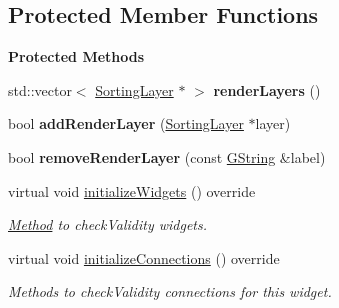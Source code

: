 \subsection*{Protected Member Functions}
\begin{Indent}\textbf{ Protected Methods}\par
\begin{DoxyCompactItemize}
\item 
\mbox{\label{classrev_1_1_view_1_1_render_layer_instance_widget_abce58d0d1c9fdaf0a4e0a95fb1e15ea6}} 
std\+::vector$<$ \mbox{\hyperlink{structrev_1_1_sorting_layer}{Sorting\+Layer}} $\ast$ $>$ {\bfseries render\+Layers} ()
\item 
\mbox{\label{classrev_1_1_view_1_1_render_layer_instance_widget_ab3d57b75fdd3ab6a3db67dc7ae5a32e7}} 
bool {\bfseries add\+Render\+Layer} (\mbox{\hyperlink{structrev_1_1_sorting_layer}{Sorting\+Layer}} $\ast$layer)
\item 
\mbox{\label{classrev_1_1_view_1_1_render_layer_instance_widget_a0578403e177027e7c3880d0a536a2f99}} 
bool {\bfseries remove\+Render\+Layer} (const \mbox{\hyperlink{classrev_1_1_g_string}{G\+String}} \&label)
\item 
\mbox{\label{classrev_1_1_view_1_1_render_layer_instance_widget_afabc7fa617f72e643e15114fdd8f01ce}} 
virtual void \mbox{\hyperlink{classrev_1_1_view_1_1_render_layer_instance_widget_afabc7fa617f72e643e15114fdd8f01ce}{initialize\+Widgets}} () override
\begin{DoxyCompactList}\small\item\em \mbox{\hyperlink{struct_method}{Method}} to check\+Validity widgets. \end{DoxyCompactList}\item 
\mbox{\label{classrev_1_1_view_1_1_render_layer_instance_widget_a6c1e237844ac16c08ec9a5fd0c578d73}} 
virtual void \mbox{\hyperlink{classrev_1_1_view_1_1_render_layer_instance_widget_a6c1e237844ac16c08ec9a5fd0c578d73}{initialize\+Connections}} () override
\begin{DoxyCompactList}\small\item\em Methods to check\+Validity connections for this widget. \end{DoxyCompactList}\item 

\end{DoxyCompactItemize}
\end{Indent}
